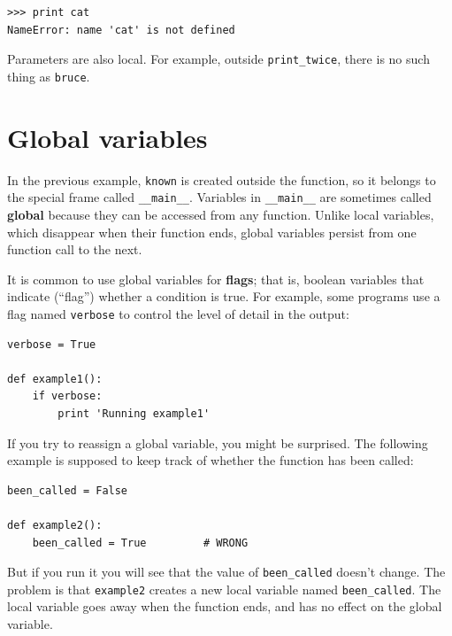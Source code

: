 \beforeverb
\begin{verbatim}
>>> print cat
NameError: name 'cat' is not defined
\end{verbatim}
\afterverb
%
Parameters are also local.
For example, outside \verb"print_twice", there is no
such thing as {\tt bruce}.


\section{Global variables}


In the previous example, {\tt known} is created outside the function,
so it belongs to the special frame called \verb"__main__".
Variables in \verb"__main__" are sometimes called {\bf global}
because they can be accessed from any function.  Unlike local
variables, which disappear when their function ends, global variables
persist from one function call to the next.


It is common to use global variables for {\bf flags}; that is, 
boolean variables that indicate (``flag'') whether a condition
is true.  For example, some programs use
a flag named {\tt verbose} to control the level of detail in the
output:

\beforeverb
\begin{verbatim}
verbose = True

def example1():
    if verbose:
        print 'Running example1'
\end{verbatim}
\afterverb
%
If you try to reassign a global variable, you might be surprised.
The following example is supposed to keep track of whether the
function has been called:


\beforeverb
\begin{verbatim}
been_called = False

def example2():
    been_called = True         # WRONG
\end{verbatim}
\afterverb
%
But if you run it you will see that the value of \verb"been_called"
doesn't change.  The problem is that {\tt example2} creates a new local
variable named \verb"been_called".  The local variable goes away when
the function ends, and has no effect on the global variable.



